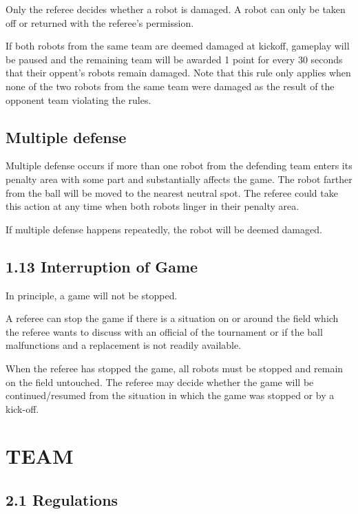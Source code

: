 \documentclass{article}
\begin{document}
Only the referee decides whether a robot is damaged. A robot can only be taken off or returned with the referee's permission. 

If both robots from the same team are deemed damaged at kickoff, gameplay will be paused and the remaining team will be awarded 1 point for every 30 seconds that their oppent's robots remain damaged. Note that this rule only applies when none of the two robots from the same team were damaged as the result of the opponent team violating the rules. 

\subsection{Multiple defense \label{ref-013}}

Multiple defense occurs if more than one robot from the defending team enters its penalty area with some part and substantially affects the game. The robot farther from the ball will be moved to the nearest neutral spot. The referee could take this action at any time when both robots linger in their penalty area. 

If multiple defense happens repeatedly, the robot will be deemed damaged. 

\subsection{1.13 Interruption of Game \label{ref-014}}

In principle, a game will not be stopped. 

A referee can stop the game if there is a situation on or around the field which the referee wants to discuss with an official of the tournament or if the ball malfunctions and a replacement is not readily available. 

When the referee has stopped the game, all robots must be stopped and remain on the field untouched. The referee may decide whether the game will be continued/resumed from the situation in which the game was stopped or by a kick-off.

\textbf{}

\section{TEAM \label{ref-015}}

\subsection{2.1 Regulations \label{ref-016}}
\end{document}
